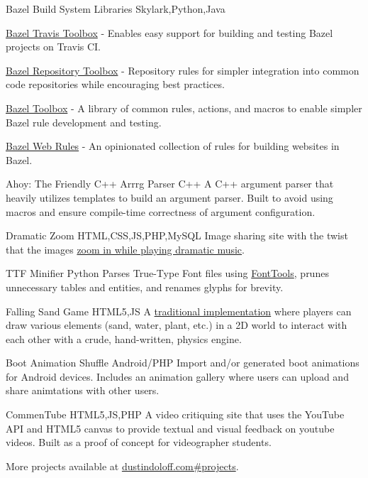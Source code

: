 \personalProject {} {Bazel Build System Libraries} {Skylark,Python,Java} {
    \begin {minimalItemize}
        \item \href {https://github.com/quittle/bazel_travis_toolbox} {Bazel Travis Toolbox} - Enables easy support for building and testing Bazel projects on Travis CI.
        \item \href {https://github.com/quittle/bazel_repository_toolbox} {Bazel Repository Toolbox} - Repository rules for simpler integration into common code repositories while encouraging best practices.
        \item \href {https://github.com/quittle/bazel_toolbox} {Bazel Toolbox} - A library of common rules, actions, and macros to enable simpler Bazel rule development and testing.
        \item \href {https://github.com/quittle/rules_web} {Bazel Web Rules} - An opinionated collection of rules for building websites in Bazel.
    \end {minimalItemize}
}

 {Ahoy: The Friendly C++ Arrrg Parser} {C++} {
    A C++ argument parser that heavily utilizes templates to build an argument parser. Built to avoid using macros and ensure compile-time correctness of argument configuration.
}

 {Dramatic Zoom} {HTML,CSS,JS,PHP,MySQL} {
    Image sharing site with the twist that the images \href {https://youtu.be/a1Y73sPHKxw} {zoom in while playing dramatic music}.
}

\personalProject {} {TTF Minifier} {Python} {
    Parses True-Type Font files using \href {https://github.com/fonttools/fonttools} {FontTools}, prunes unnecessary tables and entities, and renames glyphs for brevity.
}

 {Falling Sand Game} {HTML5,JS} {
    A \href {https://en.wikipedia.org/wiki/Falling-sand_game} {traditional implementation} where players can draw various elements (sand, water, plant, etc.) in a 2D world to interact with each other with a crude, hand-written, physics engine.
}

 {Boot Animation Shuffle} {Android/PHP} {
    Import and/or generated boot animations for Android devices. Includes an animation gallery where users can upload and share animtations with other users.
}

 {CommenTube} {HTML5,JS,PHP} {
    A video critiquing site that uses the YouTube API and HTML5 canvas to provide textual and visual feedback on youtube videos. Built as a proof of concept for videographer students.
}

More projects available at \href {https://dustindoloff.com/\#projects} {dustindoloff.com\#projects}.